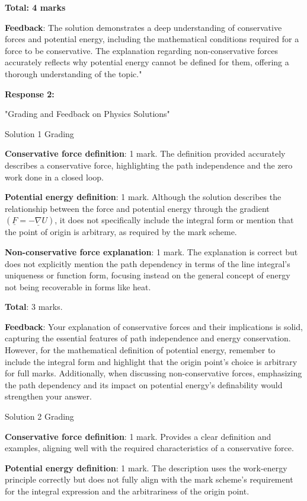 \documentclass[a4paper,11pt]{article}
\begin{document}
\textbf{Total: 4 marks}

\textbf{Feedback}: The solution demonstrates a deep understanding of conservative forces and potential energy, including the mathematical conditions required for a force to be conservative. The explanation regarding non-conservative forces accurately reflects why potential energy cannot be defined for them, offering a thorough understanding of the topic."

\textbf{Response 2:}

"Grading and Feedback on Physics Solutions"

Solution 1 Grading

\textbf{Conservative force definition}: 1 mark. The definition provided accurately describes a conservative force, highlighting the path independence and the zero work done in a closed loop.

\textbf{Potential energy definition}: 1 mark. Although the solution describes the relationship between the force and potential energy through the gradient \(( \underline{F} = -\underline{\nabla} U )\), it does not specifically include the integral form or mention that the point of origin is arbitrary, as required by the mark scheme.

\textbf{Non-conservative force explanation}: 1 mark. The explanation is correct but does not explicitly mention the path dependency in terms of the line integral's uniqueness or function form, focusing instead on the general concept of energy not being recoverable in forms like heat.

\textbf{Total}: 3 marks.

\textbf{Feedback}: Your explanation of conservative forces and their implications is solid, capturing the essential features of path independence and energy conservation. However, for the mathematical definition of potential energy, remember to include the integral form and highlight that the origin point's choice is arbitrary for full marks. Additionally, when discussing non-conservative forces, emphasizing the path dependency and its impact on potential energy's definability would strengthen your answer.

Solution 2 Grading

\textbf{Conservative force definition}: 1 mark. Provides a clear definition and examples, aligning well with the required characteristics of a conservative force.

\textbf{Potential energy definition}: 1 mark. The description uses the work-energy principle correctly but does not fully align with the mark scheme's requirement for the integral expression and the arbitrariness of the origin point.
\end{document}
